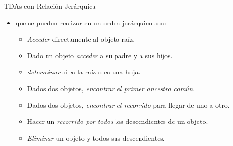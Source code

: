 \documentclass[10pt,envcountsect,spanish]{beamer}
\begin{document}
\begin{frame}[allowframebreaks]{TDAs con Relación Jerárquica - }
\begin{itemize}
\item {} que se pueden realizar en un orden jerárquico son:
\begin{itemize}
\item \textit{Acceder} directamente al objeto raíz.
\item Dado un objeto \textit{acceder} a su padre y a sus hijos.
\item \textit{determinar} si es la raíz o es una hoja.
\item Dados dos objetos, \textit{encontrar el primer ancestro común}.
\item Dados dos objetos, \textit{encontrar el  recorrido} para llegar de uno a otro.
\item Hacer un \textit{recorrido por todos}  los descendientes de un objeto.
\item \textit{Eliminar} un objeto y todos sus descendientes.
\end{itemize}

\end{itemize}

\end{frame}
\end{document}
